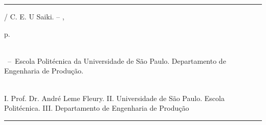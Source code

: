 \begin{fichacatalografica}\label{ficha catalografica}
	\vspace*{\fill}					%
	\hrule							%
	\begin{center}					%
	\begin{minipage}[c]{12.5cm}		%
	
	\imprimirautor
	
	\hspace{0.5cm} \imprimirtitulo  / C. E. U Saiki. --
	\imprimirlocal, \imprimirdata
	
	\hspace{0.5cm} \pageref{LastPage} p.\\
	
	\hspace{0.5cm} \imprimirorientadorRotulo~\imprimirorientador\\
	
	\hspace{0.5cm}
	\parbox[t]{\textwidth}{\imprimirtipotrabalho~--~Escola Politécnica da Universidade de São Paulo. Departamento de Engenharia de Produção.}\\
	
	\hspace{0.5cm}
		I. Prof. Dr. André Leme Fleury.
		II. Universidade de São Paulo. Escola Politécnica.
		III. Departamento de Engenharia de Produção\\ 
	
	
	\end{minipage}
	\end{center}
	\hrule
\end{fichacatalografica}